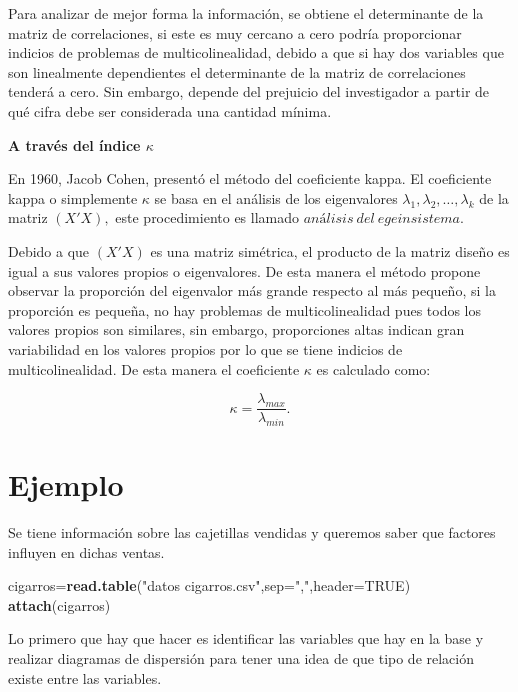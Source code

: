 \documentclass[
  a4paper,
  oneside,
  openany]{book}
\newenvironment{Shaded}{\begin{snugshade}}{\end{snugshade}}
\newcommand{\DataTypeTok}[1]{\textcolor[rgb]{0.13,0.29,0.53}{#1}}
\newcommand{\KeywordTok}[1]{\textcolor[rgb]{0.13,0.29,0.53}{\textbf{#1}}}
\newcommand{\NormalTok}[1]{#1}
\newcommand{\OtherTok}[1]{\textcolor[rgb]{0.56,0.35,0.01}{#1}}
\newcommand{\StringTok}[1]{\textcolor[rgb]{0.31,0.60,0.02}{#1}}
\begin{document}
Para analizar de mejor forma la información, se obtiene el determinante de la matriz de correlaciones, si este es muy cercano a cero podría proporcionar indicios de problemas de multicolinealidad, debido a que si hay dos variables que son linealmente dependientes el determinante de la matriz de correlaciones tenderá a cero. Sin embargo, depende del prejuicio del investigador a partir de qué cifra debe ser considerada una cantidad mínima.

\textbf{A través del índice \(\kappa\)}

En 1960, Jacob Cohen, presentó el método del coeficiente kappa. El coeficiente kappa o simplemente \(\kappa\) se basa en el análisis de los eigenvalores \(\lambda_{1},\lambda_{2},\ldots,\lambda_{k}\) de la matriz \((X'X),\) este procedimiento es llamado \(análisis \ del \ egeinsistema.\)

Debido a que \((X'X)\) es una matriz simétrica, el producto de la matriz diseño es igual a sus valores propios o eigenvalores. De esta manera el método propone observar la proporción del eigenvalor más grande respecto al más pequeño, si la proporción es pequeña, no hay problemas de multicolinealidad pues todos los valores propios son similares, sin embargo, proporciones altas indican gran variabilidad en los valores propios por lo que se tiene indicios de multicolinealidad.
De esta manera el coeficiente \(\kappa\) es calculado como:

\[\kappa=\frac{\lambda_{max}}{\lambda_{min}}.\]

\hypertarget{ejemplo-19}{%
\section{Ejemplo}\label{ejemplo-19}}

Se tiene información sobre las cajetillas vendidas y queremos saber que factores influyen en dichas ventas.

\begin{Shaded}
\begin{Highlighting}[]
\NormalTok{cigarros=}\KeywordTok{read.table}\NormalTok{(}\StringTok{"datos cigarros.csv"}\NormalTok{,}\DataTypeTok{sep=}\StringTok{","}\NormalTok{,}\DataTypeTok{header=}\OtherTok{TRUE}\NormalTok{)}
\KeywordTok{attach}\NormalTok{(cigarros)}
\end{Highlighting}
\end{Shaded}

Lo primero que hay que hacer es identificar las variables que hay en la base y realizar diagramas de dispersión para tener una idea de que tipo de relación existe entre las variables.
\end{document}
